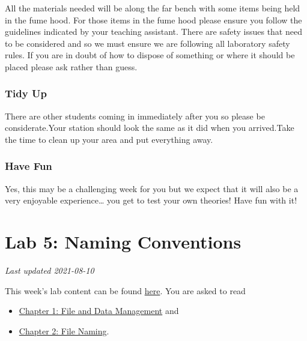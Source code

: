 \documentclass[
]{book}
\providecommand{\tightlist}{%
  \setlength{\itemsep}{0pt}\setlength{\parskip}{0pt}}
\begin{document}
All the materials needed will be along the far bench with some items being held in the fume hood. For those items in the fume hood please ensure you follow the guidelines indicated by your teaching assistant. There are safety issues that need to be considered and so we must ensure we are following all laboratory safety rules. If you are in doubt of how to dispose of something or where it should be placed please ask rather than guess.

\hypertarget{tidy-up}{%
\subsection*{Tidy Up}\label{tidy-up}}

There are other students coming in immediately after you so please be considerate.Your station should look the same as it did when you arrived.Take the time to clean up your area and put everything away.

\hypertarget{have-fun}{%
\subsection*{Have Fun}\label{have-fun}}

Yes, this may be a challenging week for you but we expect that it will also be a very enjoyable experience\ldots{} you get to test your own theories! Have fun with it!

\hypertarget{lab-5-naming-conventions}{%
\chapter*{Lab 5: Naming Conventions}\label{lab-5-naming-conventions}}

\emph{Last updated 2021-08-10}

This week's lab content can be found \href{https://ubco-biology.github.io/Procedures-and-Guidelines/file-and-data-management.html}{here}. You are asked to read

\begin{itemize}
\tightlist
\item
  \href{https://ubco-biology.github.io/Procedures-and-Guidelines/file-and-data-management.html}{Chapter 1: File and Data Management} and
\item
  \href{https://ubco-biology.github.io/Procedures-and-Guidelines/file-naming.html}{Chapter 2: File Naming}.
\end{itemize}
\end{document}
